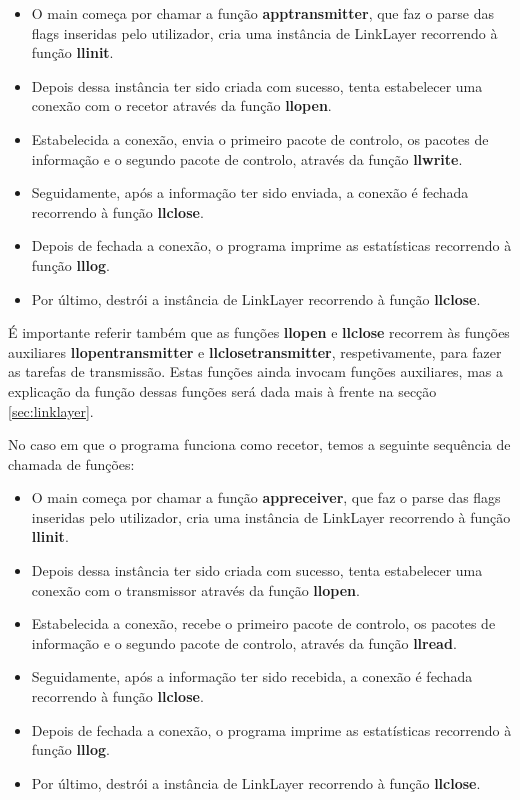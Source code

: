 \documentclass[11pt,a4paper,reqno]{article}
\numberwithin{equation}{section}
\begin{document}
\begin{itemize}
	\item O main começa por chamar a função \textbf{app\textunderscore transmitter}, que faz o parse das flags inseridas pelo utilizador, cria uma instância de LinkLayer recorrendo à função \textbf{llinit}.
	\item Depois dessa instância ter sido criada com sucesso, tenta estabelecer uma conexão com o recetor através da função \textbf{llopen}.
	\item Estabelecida a conexão, envia o primeiro pacote de controlo, os pacotes de informação e o segundo pacote de controlo, através da função \textbf{llwrite}.
	\item Seguidamente, após a informação ter sido enviada, a conexão é fechada recorrendo à função \textbf{llclose}.
	\item Depois de fechada a conexão, o programa imprime as estatísticas recorrendo à função \textbf{lllog}.
	\item Por último, destrói a instância de LinkLayer recorrendo à função \textbf{llclose}.
\end{itemize}

\vspace{5mm}

É importante referir também que as funções \textbf{llopen} e \textbf{llclose} recorrem às funções auxiliares \textbf{llopen\textunderscore transmitter} e \textbf{llclose\textunderscore transmitter}, respetivamente, para fazer as tarefas de transmissão. Estas funções ainda invocam funções auxiliares, mas a explicação da função dessas funções será dada mais à frente na secção \ref{sec:linklayer}.

\vspace{5mm}

No caso em que o programa funciona como recetor, temos a seguinte sequência de chamada de funções:

\begin{itemize}
	\item O main começa por chamar a função \textbf{app\textunderscore receiver}, que faz o parse das flags inseridas pelo utilizador, cria uma instância de LinkLayer recorrendo à função \textbf{llinit}.
	\item Depois dessa instância ter sido criada com sucesso, tenta estabelecer uma conexão com o transmissor através da função \textbf{llopen}.
	\item Estabelecida a conexão, recebe o primeiro pacote de controlo, os pacotes de informação e o segundo pacote de controlo, através da função \textbf{llread}.
	\item Seguidamente, após a informação ter sido recebida, a conexão é fechada recorrendo à função \textbf{llclose}.
	\item Depois de fechada a conexão, o programa imprime as estatísticas recorrendo à função \textbf{lllog}.
	\item Por último, destrói a instância de LinkLayer recorrendo à função \textbf{llclose}.
\end{itemize}
\end{document}

